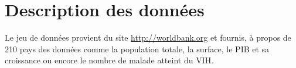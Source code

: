\section{Description des données}
Le jeu de données provient du site \url{http://worldbank.org} et fournis, à propos de 210 pays des données comme la population totale, la surface, le \gls{PIB} et sa croissance ou encore le nombre de malade atteint du \gls{VIH}.

